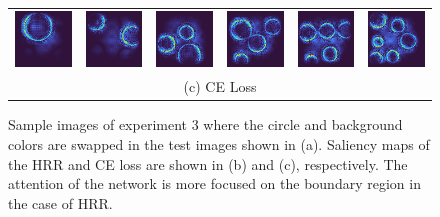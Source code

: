 \documentclass[letterpaper]{article} %
\begin{document}
\begin{figure}[!htbp]
\begin{tabular}{cccccc}
\multicolumn{1}{c}{\includegraphics[width=0.125\linewidth]{saliency/ce/circle/swap_1.png}} \hspace{-12pt} &  \multicolumn{1}{c}{\includegraphics[width=0.125\linewidth]{saliency/ce/circle/swap_2.png}} \hspace{-12pt} & \multicolumn{1}{c}{\includegraphics[width=0.125\linewidth]{saliency/ce/circle/swap_3.png}} \hspace{-12pt} & \multicolumn{1}{c}{\includegraphics[width=0.125\linewidth]{saliency/ce/circle/swap_4.png}} \hspace{-12pt} & \multicolumn{1}{c}{\includegraphics[width=0.125\linewidth]{saliency/ce/circle/swap_5.png}} \hspace{-12pt} & \multicolumn{1}{c}{\includegraphics[width=0.125\linewidth]{saliency/ce/circle/swap_6.png}} \\
\multicolumn{6}{c}{(c) CE Loss}
\end{tabular}
\caption{Sample images of experiment 3 where the circle and background colors are swapped in the test images shown in (a). Saliency maps of the HRR and CE loss are shown in (b) and (c), respectively. The attention of the network is more focused on the boundary region in the case of HRR.}
\label{fig:exp_3_saliency}
\end{figure}
\end{document}
